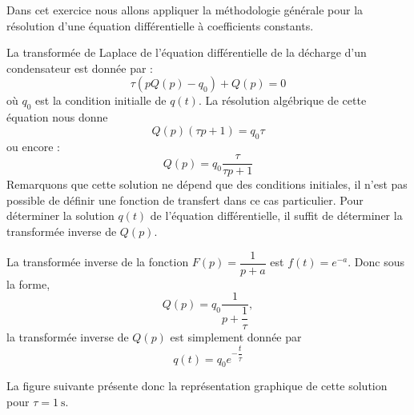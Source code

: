 
Dans cet exercice nous allons appliquer la méthodologie générale pour la
résolution d'une équation différentielle à coefficients constants.


\question{}
La transformée de Laplace de l'équation différentielle de la décharge d'un
condensateur est donnée par :
\[
    \tau(pQ(p)-q_0)+Q(p)=0
\]
où $q_0$ est la condition initialle de $q(t)$.
La résolution algébrique de cette équation nous donne 
\[
    Q(p)(\tau p+1)=q_0\tau
\]
ou encore :
\[
    Q(p)=q_0\dfrac{\tau}{\tau p+1}
\]
Remarquons que cette solution ne dépend que des conditions initiales, il n'est 
pas possible de définir une fonction de transfert dans ce cas particulier.
\question{}
Pour déterminer la solution $q(t)$ de l'équation différentielle, il suffit de 
déterminer la transformée inverse de $Q(p)$.

La transformée inverse de la fonction $F(p)=\dfrac{1}{p+a}$ est $f(t)=e^{-a}$.
Donc sous la forme,
\[
    Q(p)=q_0\dfrac{1}{p+\dfrac{1}{\tau}},
\]
la transformée inverse de $Q(p)$ est simplement donnée par 
\[
    q(t)=q_0e^{-\dfrac{t}{\tau}}
\]
\begin{center}
    
\end{center}
La figure suivante présente donc la représentation graphique de cette solution 
pour $\tau=\SI{1}{\second}$.

\begin{figure}[!h]
    \centering
    
\end{figure}

